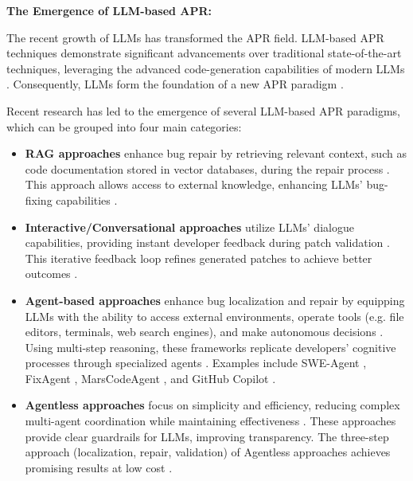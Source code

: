 \textbf{The Emergence of LLM-based APR:}

The recent growth of \acp{LLM} has transformed the APR field. LLM-based APR techniques demonstrate significant advancements over traditional state-of-the-art techniques, leveraging the advanced code-generation capabilities of modern \acp{LLM} \cite{hossainDeepDiveLarge2024}. Consequently, \acp{LLM} form the foundation of a new APR paradigm \cite{chenUnveilingPitfallsUnderstanding2025, anandComprehensiveSurveyAIDriven2024}.

Recent research has led to the emergence of several LLM-based APR paradigms, which can be grouped into four main categories:

\begin{itemize}
    \item \textbf{\ac{RAG} approaches} enhance bug repair by retrieving relevant context, such as code documentation stored in vector databases, during the repair process \cite{puvvadiCodingAgentsComprehensive2025}. This approach allows access to external knowledge, enhancing \acp{LLM}' bug-fixing capabilities \cite{houLargeLanguageModels2024, yinThinkRepairSelfDirectedAutomated2024}.

    \item \textbf{Interactive/Conversational approaches} utilize \acp{LLM}' dialogue capabilities, providing instant developer feedback during patch validation \cite{xiaAutomatedProgramRepair2024, huCanGPTO1Kill2024}. This iterative feedback loop refines generated patches to achieve better outcomes \cite{xiaAutomatedProgramRepair2024}.

    \item \textbf{Agent-based approaches} enhance bug localization and repair by equipping \acp{LLM} with the ability to access external environments, operate tools (e.g. file editors, terminals, web search engines), and make autonomous decisions \cite{anandComprehensiveSurveyAIDriven2024, puvvadiCodingAgentsComprehensive2025, mengEmpiricalStudyLLMbased2024}. Using multi-step reasoning, these frameworks replicate developers' cognitive processes through specialized agents \cite{rondonEvaluatingAgentbasedProgram2025, zhangPATCHEmpoweringLarge2025, leeUnifiedDebuggingApproach2024}. Examples include SWE-Agent \cite{yangSWEagentAgentComputerInterfaces2024}, FixAgent \cite{leeUnifiedDebuggingApproach2024}, MarsCodeAgent \cite{liuMarsCodeAgentAInative2024}, and GitHub Copilot \cite{dohmkeGitHubCopilotMeet2025}.

    \item \textbf{Agentless approaches} focus on simplicity and efficiency, reducing complex multi-agent coordination while maintaining effectiveness \cite{xiaAgentlessDemystifyingLLMbased2024, puvvadiCodingAgentsComprehensive2025}. These approaches provide clear guardrails for \acp{LLM}, improving transparency. The three-step approach (localization, repair, validation) of Agentless approaches achieves promising results at low cost \cite{xiaAgentlessDemystifyingLLMbased2024, mengEmpiricalStudyLLMbased2024}.
\end{itemize}

